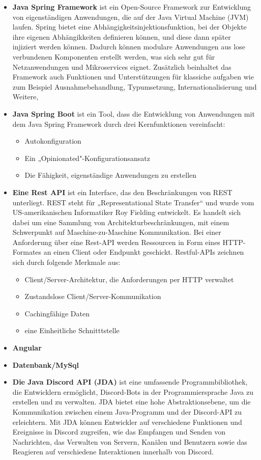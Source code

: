 \begin{itemize}
 \item \textbf{Java Spring Framework} ist ein Open-Source Framework zur Entwicklung von eigenständigen Anwendungen, die auf der Java Virtual Machine (JVM) laufen. Spring bietet eine Abhängigkeitsinjektionsfunktion, bei der Objekte ihre eigenen Abhängikkeiten definieren können, und diese dann später injiziert werden können. Dadurch können modulare Anwendungen aus lose verbundenen Komponenten erstellt werden, was sich sehr gut für Netzanwendungen und Mikroservices eignet. Zusätzlich beinhaltet das Framework auch Funktionen und Unterstützungen für klassiche aufgaben wie zum Beispiel Ausnahmebehandlung, Typumsetzung, Internationalisierung und Weitere,
 \item \textbf{Java Spring Boot} ist ein Tool, dass die Entwicklung von Anwendungen mit dem Java Spring Framework durch drei Kernfunktionen vereinfacht:
    \begin{itemize}
        \item Autokonfiguration
        \item Ein „Opinionated"-Konfigurationsansatz
        \item Die Fähigkeit, eigenständige Anwendungen zu erstellen
    \end{itemize}
 \item \textbf{Eine Rest API} ist ein Interface, das den Beschränkungen von REST unterliegt. REST steht für „Representational State Transfer“ und wurde vom US-amerikanischen Informatiker Roy Fielding entwickelt. Es handelt sich dabei um eine Sammlung von Architekturbeschränkungen, mit einem Schwerpunkt auf Maschine-zu-Maschine Kommunikation. Bei einer Anforderung über eine Rest-API werden Ressourcen in Form eines HTTP-Formates an einen Client oder Endpunkt geschickt.
 Restful-APIs zeichnen sich durch folgende Merkmale aus:
 \begin{itemize}
     \item Client/Server-Architektur, die Anforderungen per HTTP verwaltet
     \item Zustandslose Client/Server-Kommunikation
     \item Cachingfähige Daten
     \item eine Einheitliche Schnitttstelle
 \end{itemize}
 \item \textbf{Angular}
 \item \textbf{Datenbank/MySql}
 \item \textbf{Die Java Discord API (JDA)} ist eine umfassende Programmbibliothek, die Entwicklern ermöglicht, Discord-Bots in der Programmiersprache Java zu erstellen und zu verwalten. JDA bietet eine hohe Abstraktionsebene, um die Kommunikation zwischen einem Java-Programm und der Discord-API zu erleichtern. Mit JDA können Entwickler auf verschiedene Funktionen und Ereignisse in Discord zugreifen, wie das Empfangen und Senden von Nachrichten, das Verwalten von Servern, Kanälen und Benutzern sowie das Reagieren auf verschiedene Interaktionen innerhalb von Discord.
        

\end{itemize}
